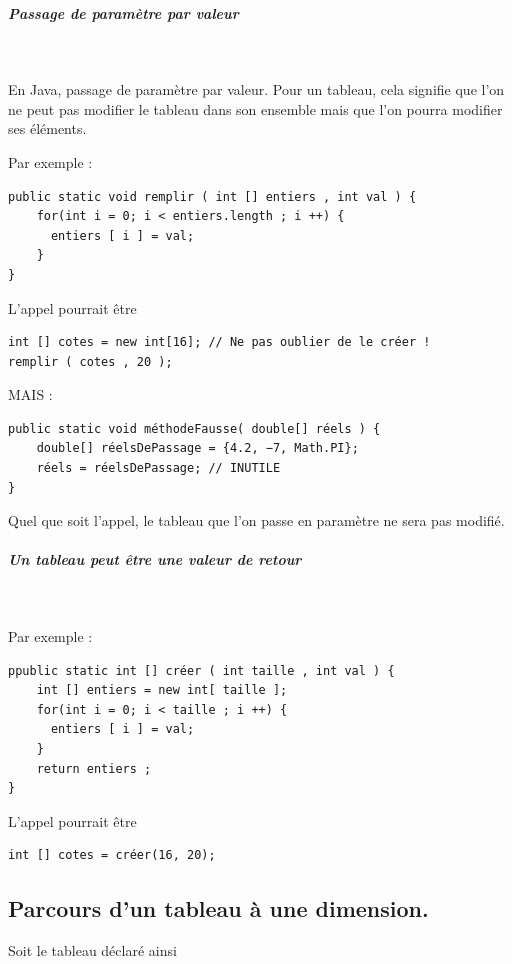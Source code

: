 \documentclass[11pt,a4paper]{article}
\begin{document}
		\subparagraph{Passage de param\`etre par valeur} 
		
					\textcolor{white}{.} \par
				
        En Java, passage de param\`etre par valeur.
        Pour un tableau, cela signifie que l'on ne peut pas
        modifier le tableau dans son ensemble mais que
        l'on pourra modifier ses \'el\'ements.
      
            \par
        Par exemple :
            \par
        \begin{verbatim}
public static void remplir ( int [] entiers , int val ) {
    for(int i = 0; i < entiers.length ; i ++) {
      entiers [ i ] = val;
    }
}\end{verbatim}L'appel pourrait \^etre
            \par
        \begin{verbatim}
int [] cotes = new int[16]; // Ne pas oublier de le créer !
remplir ( cotes , 20 );
      \end{verbatim}MAIS :
            \par
        \begin{verbatim}
public static void méthodeFausse( double[] réels ) {
    double[] réelsDePassage = {4.2, −7, Math.PI};
    réels = réelsDePassage; // INUTILE
}\end{verbatim}
        Quel que soit l'appel, le tableau que l'on passe en
        param\`etre ne sera pas modifi\'e.
      
            \par
        
			
		\subparagraph{Un tableau peut \^etre une valeur de retour} 
		
					\textcolor{white}{.} \par
				
            \par
        Par exemple :
            \par
        \begin{verbatim}
ppublic static int [] créer ( int taille , int val ) {
    int [] entiers = new int[ taille ];
    for(int i = 0; i < taille ; i ++) {
      entiers [ i ] = val;
    }
    return entiers ;
}\end{verbatim}L'appel pourrait \^etre
            \par
        \begin{verbatim}
int [] cotes = créer(16, 20);
      \end{verbatim}\subsection{Parcours d'un tableau \`a une dimension.}
		    Soit le tableau \verb@tab@ d\'eclar\'e ainsi
		  
\end{document}
